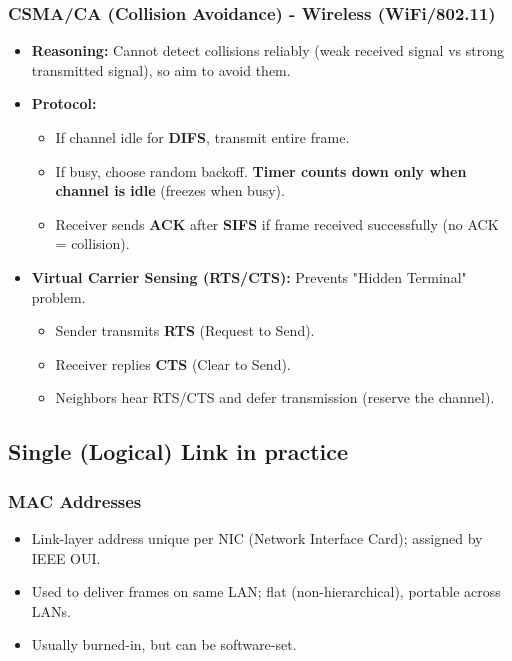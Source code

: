 \subsubsection{CSMA/CA (Collision Avoidance) - Wireless (WiFi/802.11)}
\begin{itemize}
    \item \textbf{Reasoning:} Cannot detect collisions reliably (weak received signal vs strong transmitted signal), so aim to avoid them.
    \item \textbf{Protocol:}
    \begin{itemize}
        \item If channel idle for \textbf{DIFS}, transmit entire frame.
        \item If busy, choose random backoff. \textbf{Timer counts down only when channel is idle} (freezes when busy).
        \item Receiver sends \textbf{ACK} after \textbf{SIFS} if frame received successfully (no ACK = collision).
    \end{itemize}
    \item \textbf{Virtual Carrier Sensing (RTS/CTS):} Prevents "Hidden Terminal" problem.
    \begin{itemize}
        \item Sender transmits \textbf{RTS} (Request to Send).
        \item Receiver replies \textbf{CTS} (Clear to Send).
        \item Neighbors hear RTS/CTS and defer transmission (reserve the channel).
    \end{itemize}
\end{itemize}

\subsection{Single (Logical) Link in practice}
\subsubsection{MAC Addresses}
\begin{itemize}
	\item Link-layer address unique per NIC (Network Interface Card); assigned by IEEE OUI.
	\item Used to deliver frames on same LAN; flat (non-hierarchical), portable across LANs.
	\item Usually burned-in, but can be software-set.
\end{itemize}
